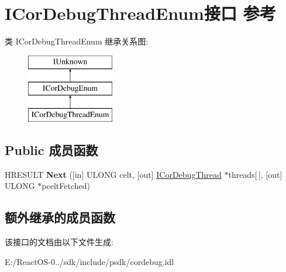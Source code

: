 \hypertarget{interface_i_cor_debug_thread_enum}{}\section{I\+Cor\+Debug\+Thread\+Enum接口 参考}
\label{interface_i_cor_debug_thread_enum}
类 I\+Cor\+Debug\+Thread\+Enum 继承关系图\+:\begin{figure}[H]
\begin{center}
\leavevmode
\includegraphics[height=3.000000cm]{interface_i_cor_debug_thread_enum}
\end{center}
\end{figure}
\subsection*{Public 成员函数}
\begin{DoxyCompactItemize}
\item 
\mbox{\label{interface_i_cor_debug_thread_enum_af4dd999a60ddeb323004609f05870b0d}} 
H\+R\+E\+S\+U\+LT {\bfseries Next} (\mbox{[}in\mbox{]} U\+L\+O\+NG celt, \mbox{[}out\mbox{]} \hyperlink{interface_i_cor_debug_thread}{I\+Cor\+Debug\+Thread} $\ast$threads\mbox{[}$\,$\mbox{]}, \mbox{[}out\mbox{]} U\+L\+O\+NG $\ast$pcelt\+Fetched)
\end{DoxyCompactItemize}
\subsection*{额外继承的成员函数}


该接口的文档由以下文件生成\+:\begin{DoxyCompactItemize}
\item 
E\+:/\+React\+O\+S-\/0../sdk/include/psdk/cordebug.\+idl\end{DoxyCompactItemize}

